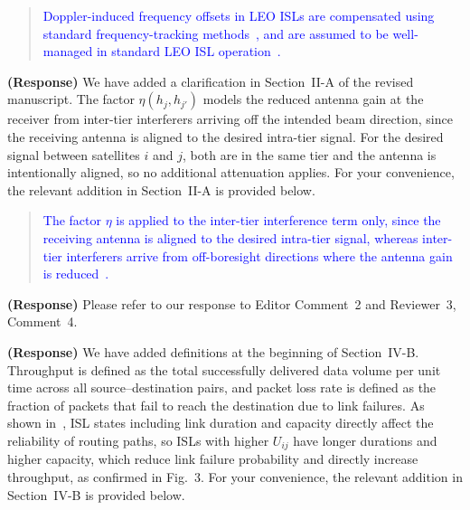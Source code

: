 \documentclass[letter]{article}
\begin{document}
\begin{quote}
\textcolor{blue}{Doppler-induced frequency offsets in LEO ISLs are compensated using standard frequency-tracking methods~\cite{darsena2024hybrid}, and are assumed to be well-managed in standard LEO ISL operation~\cite{cao2025dense}.}
\end{quote}

\vspace{10mm}
\noindent {}

\vspace{5mm}
{\bf (Response)}
We have added a clarification in Section~II-A of the revised manuscript. The factor $\eta(h_j, h_{j'})$ models the reduced antenna gain at the receiver from inter-tier interferers arriving off the intended beam direction, since the receiving antenna is aligned to the desired intra-tier signal. For the desired signal between satellites $i$ and $j$, both are in the same tier and the antenna is intentionally aligned, so no additional attenuation applies. For your convenience, the relevant addition in Section~II-A is provided below.

\begin{quote}
\textcolor{blue}{The factor $\eta$ is applied to the inter-tier interference term only, since the receiving antenna is aligned to the desired intra-tier signal, whereas inter-tier interferers arrive from off-boresight directions where the antenna gain is reduced~\cite{cao2025dense}.}
\end{quote}

\vspace{10mm}
\noindent {}

\vspace{5mm}
{\bf (Response)}
Please refer to our response to Editor Comment~2 and Reviewer~3, Comment~4.

\vspace{10mm}
\noindent {}

\vspace{5mm}
{\bf (Response)}
We have added definitions at the beginning of Section~IV-B. Throughput is defined as the total successfully delivered data volume per unit time across all source--destination pairs, and packet loss rate is defined as the fraction of packets that fail to reach the destination due to link failures. As shown in~\cite{han2023time}, ISL states including link duration and capacity directly affect the reliability of routing paths, so ISLs with higher $U_{ij}$ have longer durations and higher capacity, which reduce link failure probability and directly increase throughput, as confirmed in Fig.~3. For your convenience, the relevant addition in Section~IV-B is provided below.
\end{document}

